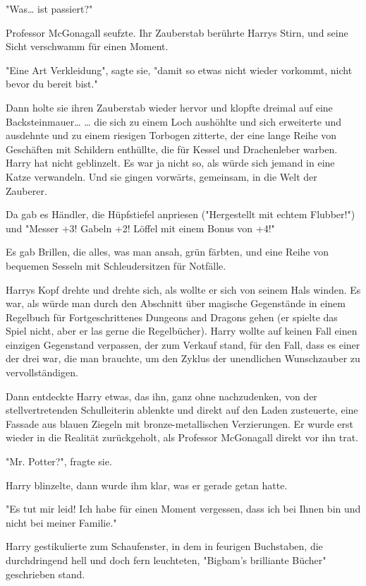 {"Was… ist passiert?"

Professor McGonagall seufzte. Ihr Zauberstab berührte Harrys Stirn, und seine Sicht verschwamm für einen Moment.

"Eine Art Verkleidung", sagte sie, "damit so etwas nicht wieder vorkommt, nicht bevor du bereit bist."

Dann holte sie ihren Zauberstab wieder hervor und klopfte dreimal auf eine Backsteinmauer… … die sich zu einem Loch aushöhlte und sich erweiterte und ausdehnte und zu einem riesigen Torbogen zitterte, der eine lange Reihe von Geschäften mit Schildern enthüllte, die für Kessel und Drachenleber warben. Harry hat nicht geblinzelt. Es war ja nicht so, als würde sich jemand in eine Katze verwandeln. Und sie gingen vorwärts, gemeinsam, in die Welt der Zauberer.

Da gab es Händler, die Hüpfstiefel anpriesen ("Hergestellt mit echtem Flubber!") und "Messer +3! Gabeln +2! Löffel mit einem Bonus von +4!"

Es gab Brillen, die alles, was man ansah, grün färbten, und eine Reihe von bequemen Sesseln mit Schleudersitzen für Notfälle.

Harrys Kopf drehte und drehte sich, als wollte er sich von seinem Hals winden. Es war, als würde man durch den Abschnitt über magische Gegenstände in einem Regelbuch für Fortgeschrittenes Dungeons and Dragons gehen (er spielte das Spiel nicht, aber er las gerne die Regelbücher). Harry wollte auf keinen Fall einen einzigen Gegenstand verpassen, der zum Verkauf stand, für den Fall, dass es einer der drei war, die man brauchte, um den Zyklus der unendlichen Wunschzauber zu vervollständigen.

Dann entdeckte Harry etwas, das ihn, ganz ohne nachzudenken, von der stellvertretenden Schulleiterin ablenkte und direkt auf den Laden zusteuerte, eine Fassade aus blauen Ziegeln mit bronze-metallischen Verzierungen. Er wurde erst wieder in die Realität zurückgeholt, als Professor McGonagall direkt vor ihn trat.

"Mr. Potter?", fragte sie.

Harry blinzelte, dann wurde ihm klar, was er gerade getan hatte.

"Es tut mir leid! Ich habe für einen Moment vergessen, dass ich bei Ihnen bin und nicht bei meiner Familie."

Harry gestikulierte zum Schaufenster, in dem in feurigen Buchstaben, die durchdringend hell und doch fern leuchteten, "Bigbam's brilliante Bücher" geschrieben stand.

}
